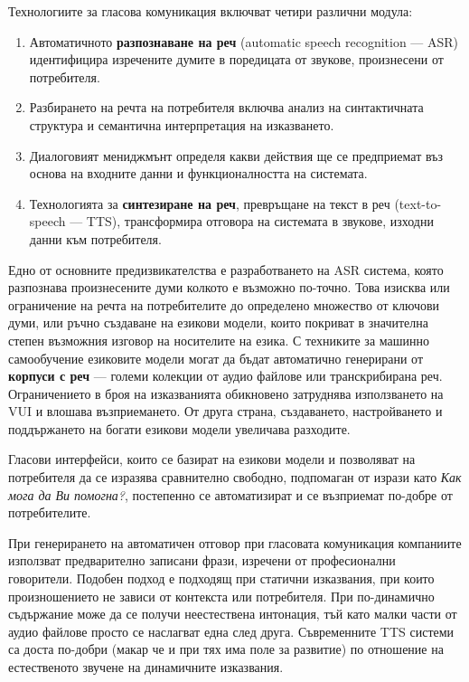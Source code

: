 \documentclass[]{../../metanetpaper}
\begin{document}
\begin{multicols}{2}
Технологиите за гласова комуникация включват четири различни модула:

\begin{enumerate}
\item Автоматичното \textbf{разпознаване на реч}  (automatic speech recognition — ASR)  идентифицира изречените думите в поредицата от звукове, произнесени от потребителя.
\item Разбирането на речта на потребителя включва анализ на синтактичната структура и семантична интерпретация  на изказването.
\item Диалоговият мениджмънт определя какви действия ще се предприемат въз основа на входните данни и функционалността на системата.
\item Технологията за \textbf{синтезиране на реч}, превръщане на текст в
 реч (text-to-speech — TTS), трансформира отговора на системата в
 звукове, изходни данни към потребителя.
\end{enumerate}

Едно от основните предизвикателства е разработването на ASR система, която разпознава произнесените думи колкото е възможно по-точно. Това изисква или
 ограничение на речта на потребителите до определено множество от ключови думи, или ръчно създаване на езикови модели, които покриват
в значителна степен възможния изговор на носителите на езика.
С техниките за машинно самообучение езиковите модели могат да бъдат автоматично генерирани от \textbf{корпуси с реч} — големи колекции от аудио файлове или транскрибирана реч.
Ограничението в броя на изказванията обикновено затруднява  използването на VUI  и влошава възприемането. От друга страна, създаването, настройването и поддържането на богати  езикови модели увеличава разходите.
 
Гласови интерфейси, които се базират на езикови модели и позволяват на потребителя да се изразява сравнително свободно, подпомаган от изрази като \textit{Как мога да Ви помогна?}, постепенно се автоматизират и се възприемат по-добре от потребителите.


При генерирането на автоматичен отговор при гласовата комуникация компаниите използват предварително записани фрази, изречени от професионални говорители. Подобен подход е подходящ при статични изказвания, при които произношението не зависи от контекста или потребителя. При по-динамично съдържание може да се получи неестествена интонация, тъй като  малки части от аудио файлове просто се наслагват една след друга. Съвременните TTS системи са доста по-добри (макар че и при тях  има поле за развитие) по отношение на естественото звучене 
 на динамичните изказвания.


\end{multicols}
\end{document}
